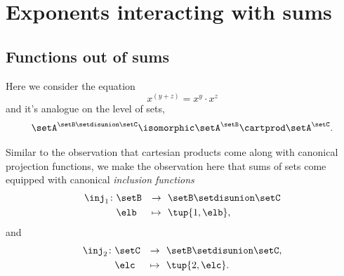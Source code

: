 


\section{Exponents interacting with sums}
\label{sec:arithmetic-exponents-sums}


\subsection{Functions out of sums}

Here we consider the equation
\begin{equation}
    x^{(y + z)}           = x^y \cdot x^z
\end{equation}
and it's analogue on the level of sets,
\begin{equation}
    \setA^{\setB \setdisunion \setC}           \isomorphic \setA^\setB \cartprod \setA^\setC.
\end{equation}

Similar to the observation that cartesian products come along with canonical projection functions, we make the  observation here that sums of sets come equipped with canonical \emph{inclusion functions}
\begin{equation}
    \begin{aligned}
        \inj_1 \colon & \setB & \to     & \ \ \setB \setdisunion \setC \\
                      & \elb  & \mapsto & \ \  \tup{1, \elb},
    \end{aligned}
\end{equation}
and
\begin{equation}
    \begin{aligned}
        \inj_2 \colon & \setC & \to     & \ \ \setB \setdisunion \setC, \\
                      & \elc  & \mapsto & \ \  \tup{2, \elc}.
    \end{aligned}
\end{equation}


